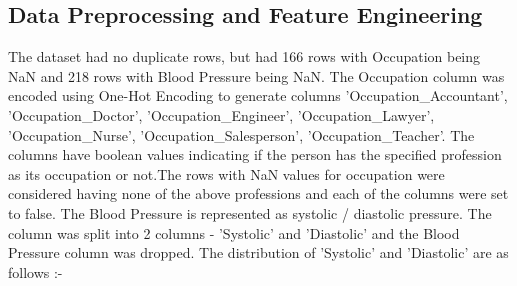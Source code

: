\documentclass[10pt,twocolumn,letterpaper]{article}
\begin{document}
\subsection{Data Preprocessing and Feature Engineering}
The dataset had no duplicate rows, but had 166 rows with Occupation being NaN and 218 rows with Blood Pressure being NaN. The Occupation column was encoded using One-Hot Encoding to generate columns 'Occupation\_Accountant', 'Occupation\_Doctor', 'Occupation\_Engineer', 'Occupation\_Lawyer', 'Occupation\_Nurse', 'Occupation\_Salesperson', 'Occupation\_Teacher'. The columns have boolean values indicating if the person has the specified profession as its occupation or not.The rows with NaN values for occupation were considered having none of the above professions and each of the columns were set to false. The Blood Pressure is represented as systolic / diastolic pressure. The column was split into 2 columns - 'Systolic' and 'Diastolic' and the Blood Pressure column was dropped. The distribution of 'Systolic' and 'Diastolic' are as follows :- 
\end{document}

